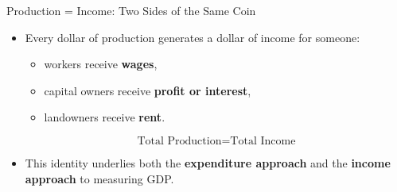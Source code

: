 \documentclass[aspectratio=169]{beamer}
\begin{document}
\begin{frame}{Production = Income: Two Sides of the Same Coin}
\transfade
\begin{itemize}[<+->]
  \item Every dollar of production generates a dollar of \alert{income} for someone:
  \begin{itemize}[<+->]
    \item workers receive \textbf{wages},
    \item capital owners receive \textbf{profit or interest},
    \item landowners receive \textbf{rent}.
  \end{itemize}
  \[
    \text{Total Production} = \text{Total Income}
  \]
  \item This identity underlies both the \textbf{expenditure approach} and the \textbf{income approach} to measuring GDP.
\end{itemize}
\end{frame}
\end{document}
